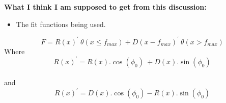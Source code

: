 {\bf What I think I am supposed to get from this discussion:}
\begin{itemize}
\item The fit functions being used.
\end{itemize}


\begin{equation}
F = R(x)^{'}~\theta(x \leq f_{max}) + D(x-f_{max})^{'}~\theta(x > f_{max})
\label{equation:fit funtion}
\end{equation}
Where 
\begin{equation}
R(x)^{'}=R(x) . \cos(\phi_0)~ + D(x) .\sin(\phi_0)
\end{equation}\\
and
\begin{equation}
R(x)^{'}=D(x) . \cos(\phi_0) - R(x) .\sin(\phi_0)
\end{equation}

